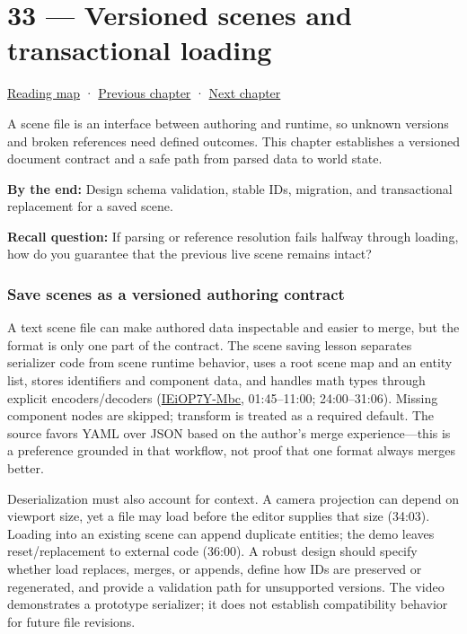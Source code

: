 \hypertarget{06-engine-ii-ch033}{}
\chapter{33 --- Versioned scenes and transactional loading}\label{06-engine-ii-ch033-versioned-scenes-and-transactional-loading}

\hyperref[volume-reading-map]{Reading map} · \hyperref[06-engine-ii-ch032-terrain-materials-and-image-composition]{Previous chapter} · \hyperref[06-engine-ii-ch034-rigid-body-motion-from-forces-to-contact]{Next chapter}

A scene file is an interface between authoring and runtime, so unknown versions and broken references need defined outcomes. This chapter establishes a versioned document contract and a safe path from parsed data to world state.

\textbf{By the end:} Design schema validation, stable IDs, migration, and transactional replacement for a saved scene.

\textbf{Recall question:} If parsing or reference resolution fails halfway through loading, how do you guarantee that the previous live scene remains intact?

\subsection{Save scenes as a versioned authoring contract}\label{06-engine-ii-ch033-save-scenes-as-a-versioned-authoring-contract}

A text scene file can make authored data inspectable and easier to merge, but the format is only one part of the contract. The scene saving lesson separates serializer code from scene runtime behavior, uses a root scene map and an entity list, stores identifiers and component data, and handles math types through explicit encoders/decoders (\href{https://www.youtube.com/watch?v=IEiOP7Y-Mbc}{IEiOP7Y-Mbc}, 01:45--11:00; 24:00--31:06). Missing component nodes are skipped; transform is treated as a required default. The source favors YAML over JSON based on the author's merge experience---this is a preference grounded in that workflow, not proof that one format always merges better.

Deserialization must also account for context. A camera projection can depend on viewport size, yet a file may load before the editor supplies that size (34:03). Loading into an existing scene can append duplicate entities; the demo leaves reset/replacement to external code (36:00). A robust design should specify whether load replaces, merges, or appends, define how IDs are preserved or regenerated, and provide a validation path for unsupported versions. The video demonstrates a prototype serializer; it does not establish compatibility behavior for future file revisions.

